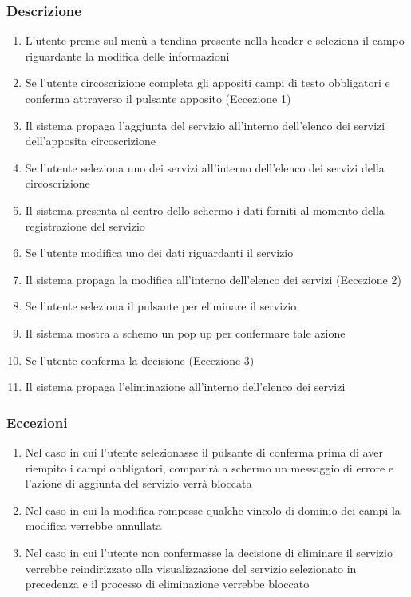         \subsubsection{Descrizione}
            \begin{enumerate}
                \item L'utente preme sul menù a tendina presente nella header e seleziona il campo riguardante la modifica delle informazioni
                \item Se l'utente circoscrizione completa gli appositi campi di testo obbligatori e conferma attraverso il pulsante apposito (Eccezione 1)
                \item Il sistema propaga l'aggiunta del servizio all'interno dell'elenco dei servizi dell'apposita circoscrizione
                \item Se l'utente seleziona uno dei servizi all'interno dell'elenco dei servizi della circoscrizione
                \item Il sistema presenta al centro dello schermo i dati forniti al momento della registrazione del servizio
                \item Se l'utente modifica uno dei dati riguardanti il servizio
                \item Il sistema propaga la modifica all'interno dell'elenco dei servizi (Eccezione 2)
                \item Se l'utente seleziona il pulsante per eliminare il servizio
                \item Il sistema mostra a schemo un pop up per confermare tale azione
                \item Se l'utente conferma la decisione (Eccezione 3)
                \item Il sistema propaga l'eliminazione all'interno dell'elenco dei servizi
            \end{enumerate}
        \subsubsection{Eccezioni}
            \begin{enumerate}
                \item Nel caso in cui l'utente selezionasse il pulsante di conferma prima di aver riempito i campi obbligatori, comparirà a schermo un messaggio di errore e l'azione di aggiunta del servizio verrà bloccata
                \item Nel caso in cui la modifica rompesse qualche vincolo di dominio dei campi la modifica verrebbe annullata
                \item Nel caso in cui l'utente non confermasse la decisione di eliminare il servizio verrebbe reindirizzato alla visualizzazione del servizio selezionato in precedenza e il processo di eliminazione verrebbe bloccato
            \end{enumerate}


